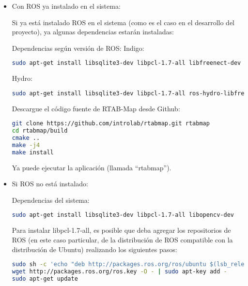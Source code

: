 \begin{itemize}
	\item Con ROS ya instalado en el sistema:

	Si ya está instalado ROS en el sistema (como es el caso en el desarrollo del proyecto), ya algunas dependencias estarán instaladas:

	Dependencias según versión de ROS:
	Indigo:
	\begin{blackcodebox}
	\begin{lstlisting}[language=bash]
sudo apt-get install libsqlite3-dev libpcl-1.7-all libfreenect-dev libopencv-dev
	\end{lstlisting}
	\end{blackcodebox}
	Hydro:
	\begin{blackcodebox}
	\begin{lstlisting}[language=bash]
sudo apt-get install libsqlite3-dev libpcl-1.7-all ros-hydro-libfreenect ros-hydro-opencv2
	\end{lstlisting}
	\end{blackcodebox}

	Descargue el código fuente de RTAB-Map desde Github:
	\begin{blackcodebox}
	\begin{lstlisting}[language=bash]
git clone https://github.com/introlab/rtabmap.git rtabmap
cd rtabmap/build
cmake ..
make -j4
make install
	\end{lstlisting}
	\end{blackcodebox}

	Ya puede ejecutar la aplicación (llamada ``rtabmap'').

	\item Si ROS no está instalado:

	Dependencias del sistema:
	\begin{blackcodebox}
	\begin{lstlisting}[language=bash]
sudo apt-get install libsqlite3-dev libpcl-1.7-all libopencv-dev
	\end{lstlisting}
	\end{blackcodebox}

	Para instalar libpcl-1.7-all, es posible que deba agregar los repositorios de ROS (en este caso particular, de la distribución de ROS compatible con la distribución de Ubuntu) realizando los siguientes pasos:
	\begin{blackcodebox}
	\begin{lstlisting}[language=bash]
sudo sh -c 'echo "deb http://packages.ros.org/ros/ubuntu $(lsb_release -sc) main" > /etc/apt/sources.list.d/ros-latest.list'
wget http://packages.ros.org/ros.key -O - | sudo apt-key add -
sudo apt-get update
	\end{lstlisting}
	\end{blackcodebox}


\end{itemize}
